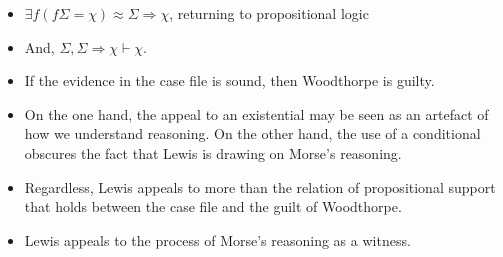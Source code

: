 \documentclass[10pt]{article}
\begin{document}
\begin{itemize}
\begin{itemize}
\begin{itemize}
    \end{itemize}
  \end{itemize}
\item \(\exists f(f\Sigma = \chi) \approx \Sigma \Rightarrow \chi\), returning to propositional logic
\item And, \(\Sigma, \Sigma \Rightarrow \chi \vdash \chi\).
\item If the evidence in the case file is sound, then Woodthorpe is guilty.
\item On the one hand, the appeal to an existential may be seen as an artefact of how we understand reasoning.
  On the other hand, the use of a conditional obscures the fact that Lewis is drawing on Morse's reasoning.
\item Regardless, Lewis appeals to more than the relation of propositional support that holds between the case file and the guilt of Woodthorpe.
\item Lewis appeals to the process of Morse's reasoning as a witness.
\end{itemize}
\end{document}
